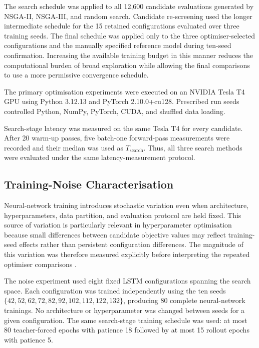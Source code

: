 \documentclass[a4paper,fleqn]{cas-sc}
\begin{document}
The search schedule was applied to all 12,600 candidate evaluations generated by NSGA-II, NSGA-III, and random search. Candidate re-screening used the longer intermediate schedule for the 15 retained configurations evaluated over three training seeds. The final schedule was applied only to the three optimiser-selected configurations and the manually specified reference model during ten-seed confirmation. Increasing the available training budget in this manner reduces the computational burden of broad exploration while allowing the final comparisons to use a more permissive convergence schedule.

The primary optimisation experiments were executed on an NVIDIA Tesla T4 GPU
using Python 3.12.13 and PyTorch 2.10.0+cu128. Prescribed run seeds controlled
Python, NumPy, PyTorch, CUDA, and shuffled data loading.

Search-stage latency was measured on the same Tesla T4 for every candidate.
After 20 warm-up passes, five batch-one forward-pass measurements were
recorded and their median was used as $T_{\mathrm{search}}$. Thus, all three
search methods were evaluated under the same latency-measurement protocol.




\subsection{Training-Noise Characterisation}
\label{sec:noise_protocol}

Neural-network training introduces stochastic variation even when architecture, hyperparameters, data partition, and evaluation protocol are held fixed. This source of variation is particularly relevant in hyperparameter optimisation because small differences between candidate objective values may reflect training-seed effects rather than persistent configuration differences. The magnitude of this variation was therefore measured explicitly before interpreting the repeated optimiser comparisons \cite{derrac2011nonparam,latorre2021guidelines}.

The noise experiment used eight fixed LSTM configurations spanning the search space. Each configuration was trained independently using the ten seeds $\{42,52,62,72,82,92,102,112,122,132\}$, producing 80 complete neural-network trainings. No architecture or hyperparameter was changed between seeds for a given configuration. The same search-stage training schedule was used: at most 80 teacher-forced epochs with patience 18 followed by at most 15 rollout epochs with patience 5.
\end{document}
